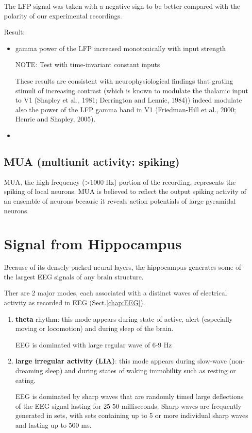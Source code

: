 The LFP signal was taken with a negative sign to be better compared with the
polarity of our experimental recordings.

Result:	
\begin{itemize}
  \item gamma power of the LFP increased monotonically with input strength

NOTE: Test with time-invariant constant inputs

These results are consistent with neurophysiological findings that grating
stimuli of increasing contrast (which is known to modulate the thalamic input to
V1 (Shapley et al., 1981; Derrington and Lennie, 1984)) indeed modulate also the
power of the LFP gamma band in V1 (Friedman-Hill et al., 2000; Henrie and
Shapley, 2005).

  
  \item 
\end{itemize}


\subsection{MUA (multiunit activity: spiking)}
\label{sec:MUA}
\label{sec:multi-unit-activity}

MUA, the high-frequency (>1000 Hz) portion of the recording, represents the
spiking of local neurons.
MUA is believed to reflect the output spiking activity of an ensemble of neurons
because it reveals action potentials of large pyramidal neurons.

\section{Signal from Hippocampus}

Because of its densely packed neural layers, the hippocampus generates some of
the largest EEG signals of any brain structure.

Ther are 2 major modes, each associated with a distinct waves of electrical
activity as recorded in EEG (Sect.\ref{chap:EEG}).
\begin{enumerate}
  \item {\bf theta} rhythm: this mode appears during state of active, alert
  (especially moving or locomotion) and during sleep of the brain.
  
  EEG is dominated with large regular wave of 6-9 Hz
  
  \item {\bf large irregular activity (LIA)}: this mode appears during slow-wave
  (non-dreaming sleep) and during states of waking immobility such as resting or
  eating.
  
  EEG is dominated by sharp waves that are randomly timed large deflections of
  the EEG signal lasting for 25-50 milliseconds. Sharp waves are frequently
  generated in sets, with sets containing up to 5 or more individual sharp waves
  and lasting up to 500 ms.
\end{enumerate}

